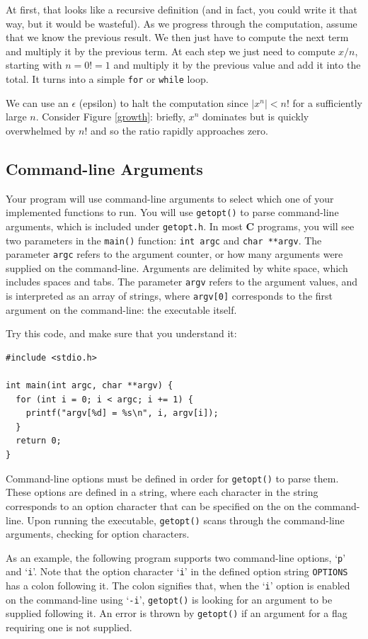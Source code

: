 \documentclass[11pt]{article}
\begin{document}
At first, that looks like a recursive definition (and in fact, you
could write it that way, but it would be wasteful). As we progress
through the computation, assume that we know the previous result.
We then just have to compute the next term and multiply it by the
previous term.  At each step we just need to compute ${x} / {n}$,
starting with $n= 0! = 1$ and multiply it by the previous value and
add it into the total.  It turns into a simple \texttt{for} or
\texttt{while} loop.

We can use an $\epsilon$ (epsilon) to halt the computation since
$|x^n| < n!$ for a sufficiently large $n$.  Consider Figure \ref{growth}:
briefly, $x^n$ dominates but is quickly overwhelmed by $n!$ and so
the ratio rapidly approaches zero.

\subsection{Command-line Arguments}
Your program will use command-line arguments to select which one of your
implemented functions to run. You will use \texttt{getopt()} to parse
command-line arguments, which is included under \texttt{getopt.h}. In most
\textbf{C} programs, you will see two parameters in the \texttt{main()}
function: \texttt{int argc} and \texttt{char **argv}. The parameter
\texttt{argc} refers to the argument counter, or how many arguments were
supplied on the command-line. Arguments are delimited by white space, which
includes spaces and tabs.  The parameter \texttt{argv} refers to the argument values, and
is interpreted as an array of strings, where \texttt{argv[0]} corresponds to the
first argument on the command-line: the executable itself.

Try this code, and make sure that you understand it:
\begin{lstlisting}
#include <stdio.h>

int main(int argc, char **argv) {
  for (int i = 0; i < argc; i += 1) {
    printf("argv[%d] = %s\n", i, argv[i]);
  }
  return 0;
}
\end{lstlisting}

Command-line options must be defined in order for \texttt{getopt()} to
parse them. These options are defined in a string, where each character in the
string corresponds to an option character that can be specified on the on the
command-line. Upon running the executable,
\texttt{getopt()} scans through the command-line arguments, checking for option
characters.

As an example, the following program supports two command-line options,
`\texttt{p}' and `\texttt{i}'. Note that the option character `\texttt{i}' in the defined option string
\texttt{OPTIONS} has a colon following it. The colon signifies that, when the
`\texttt{i}' option is enabled on the command-line using `\texttt{-i}', \texttt{getopt()} is
looking for an argument to be supplied following it. An error is thrown by
\texttt{getopt()} if an argument for a flag requiring one is not supplied.
\end{document}
